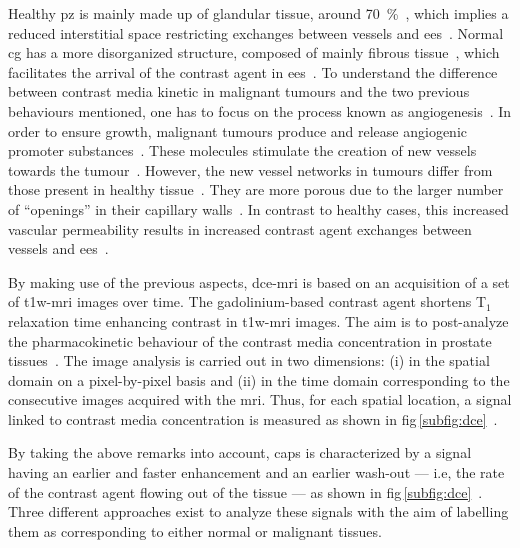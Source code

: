 Healthy \ac{pz} is mainly made up of glandular tissue, around
\SI{70}{\percent}~\cite{Choi2007}, which implies a reduced interstitial space
restricting exchanges between vessels and
\ac{ees}~\cite{Buckley2004,Niekerk2009}.
Normal \ac{cg} has a more disorganized structure, composed of mainly fibrous
tissue~\cite{Choi2007,Hoeks2011}, which facilitates the arrival of the contrast
agent in \ac{ees}~\cite{Niekerk2013}.
To understand the difference between contrast media kinetic in malignant
tumours and the two previous behaviours mentioned, one has to focus on the
process known as angiogenesis~\cite{Carmeliet2000}.
In order to ensure growth, malignant tumours produce and release angiogenic
promoter substances~\cite{Carmeliet2000}.
These molecules stimulate the creation of new vessels towards the
tumour~\cite{Carmeliet2000}.
However, the new vessel networks in tumours differ from those present in
healthy tissue~\cite{Gribbestad2005}.
They are more porous due to the larger number of ``openings'' in their
capillary walls~\cite{Gribbestad2005,Choi2007}.
In contrast to healthy cases, this increased vascular permeability results in
increased contrast agent exchanges between vessels and
\ac{ees}~\cite{Verma2012}.

By making use of the previous aspects, \ac{dce}-\ac{mri} is based on an
acquisition of a set of \ac{t1w}-\ac{mri} images over time.
The gadolinium-based contrast agent shortens T$_1$ relaxation time enhancing
contrast in \ac{t1w}-\ac{mri} images.
The aim is to post-analyze the pharmacokinetic behaviour of the contrast media
concentration in prostate tissues~\cite{Verma2012}.
The image analysis is carried out in two dimensions: (i) in the spatial domain
on a pixel-by-pixel basis and (ii) in the time domain corresponding to the
consecutive images acquired with the \ac{mri}.
Thus, for each spatial location, a signal linked to contrast media
concentration is measured as shown in
\acs{fig}\,\ref{subfig:dce}~\cite{Tofts2010}.

By taking the above remarks into account, \acp{cap} is characterized by a
signal having an earlier and faster enhancement and an earlier wash-out ---
i.e, the rate of the contrast agent flowing out of the tissue --- as shown in
\acs{fig}\,\ref{subfig:dce}~\cite{Verma2012}.
Three different approaches exist to analyze these signals with the aim of
labelling them as corresponding to either normal or malignant tissues.

